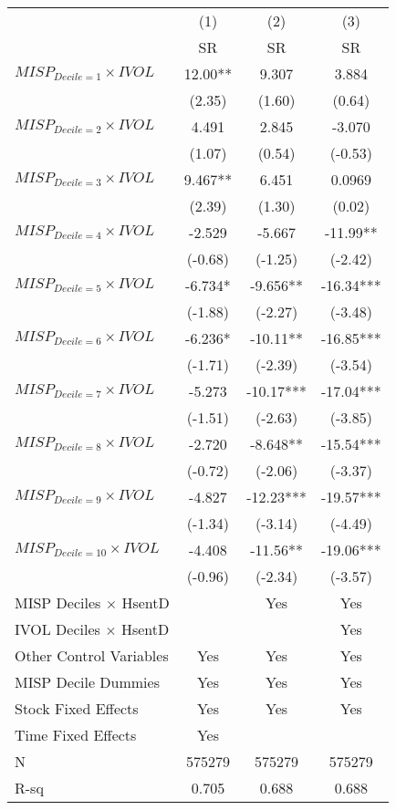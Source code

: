 \begin{tabular}{lccc}
\toprule
        & (1)     & (2)     & (3) \\
        & SR      & SR      & SR \\
\midrule
$MISP_{Decile = 1} \times IVOL$ & 12.00** & 9.307   & 3.884 \\
        & (2.35)  & (1.60)  & (0.64) \\
$MISP_{Decile = 2} \times IVOL$ & 4.491   & 2.845   & -3.070 \\
        & (1.07)  & (0.54)  & (-0.53) \\
$MISP_{Decile = 3} \times IVOL$ & 9.467** & 6.451   & 0.0969 \\
        & (2.39)  & (1.30)  & (0.02) \\
$MISP_{Decile = 4} \times IVOL$ & -2.529  & -5.667  & -11.99** \\
        & (-0.68) & (-1.25) & (-2.42) \\
$MISP_{Decile = 5} \times IVOL$ & -6.734* & -9.656** & -16.34*** \\
        & (-1.88) & (-2.27) & (-3.48) \\
$MISP_{Decile = 6} \times IVOL$ & -6.236* & -10.11** & -16.85*** \\
        & (-1.71) & (-2.39) & (-3.54) \\
$MISP_{Decile = 7} \times IVOL$ & -5.273  & -10.17*** & -17.04*** \\
        & (-1.51) & (-2.63) & (-3.85) \\
$MISP_{Decile = 8} \times IVOL$ & -2.720  & -8.648** & -15.54*** \\
        & (-0.72) & (-2.06) & (-3.37) \\
$MISP_{Decile = 9} \times IVOL$ & -4.827  & -12.23*** & -19.57*** \\
        & (-1.34) & (-3.14) & (-4.49) \\
$MISP_{Decile = 10} \times IVOL$ & -4.408  & -11.56** & -19.06*** \\
        & (-0.96) & (-2.34) & (-3.57) \\
\midrule
MISP Deciles $\times$ HsentD &         & Yes     & Yes \\
IVOL Deciles $\times$ HsentD &         &         & Yes \\
Other Control Variables & Yes     & Yes     & Yes \\
MISP Decile Dummies & Yes     & Yes     & Yes \\
Stock Fixed Effects & Yes     & Yes     & Yes \\
Time Fixed Effects & Yes     &         &  \\
N       & 575279  & 575279  & 575279 \\
R-sq    & 0.705   & 0.688   & 0.688 \\
\bottomrule
\end{tabular}%
